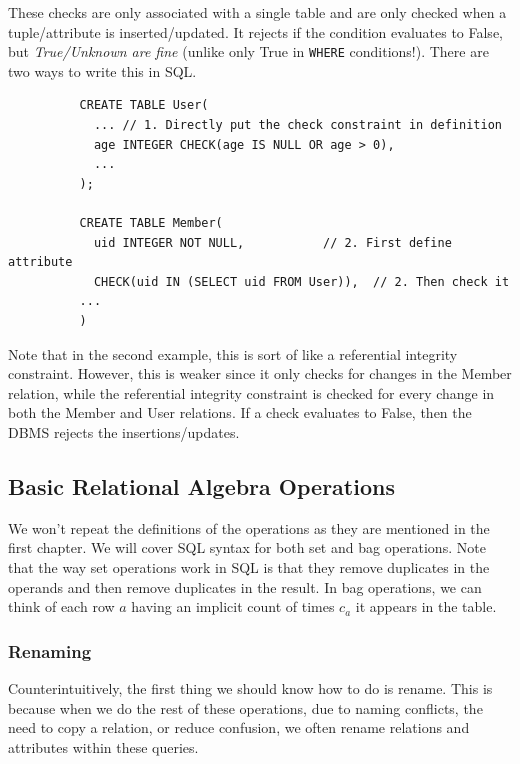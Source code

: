 \documentclass{article}
\begin{document}
      \begin{definition}
        These checks are only associated with a single table and are only checked when a tuple/attribute is inserted/updated. It rejects if the condition evaluates to False, but \textit{True/Unknown are fine} (unlike only True in \texttt{WHERE} conditions!). There are two ways to write this in SQL. 
        \begin{lstlisting}
          CREATE TABLE User(
            ... // 1. Directly put the check constraint in definition
            age INTEGER CHECK(age IS NULL OR age > 0), 
            ...
          ); 

          CREATE TABLE Member(
            uid INTEGER NOT NULL,           // 2. First define attribute 
            CHECK(uid IN (SELECT uid FROM User)),  // 2. Then check it 
          ...
          )
        \end{lstlisting}
        Note that in the second example, this is sort of like a referential integrity constraint. However, this is weaker since it only checks for changes in the Member relation, while the referential integrity constraint is checked for every change in both the Member and User relations. If a check evaluates to False, then the DBMS rejects the insertions/updates. 
      \end{definition}

  \subsection{Basic Relational Algebra Operations} 

    We won't repeat the definitions of the operations as they are mentioned in the first chapter. We will cover SQL syntax for both set and bag operations. Note that the way set operations work in SQL is that they remove duplicates in the operands and then remove duplicates in the result. In bag operations, we can think of each row $a$ having an implicit count of times $c_a$ it appears in the table.  

    \subsubsection{Renaming}
      
      Counterintuitively, the first thing we should know how to do is rename. This is because when we do the rest of these operations, due to naming conflicts, the need to copy a relation, or reduce confusion, we often rename relations and attributes within these queries. 
\end{document}
